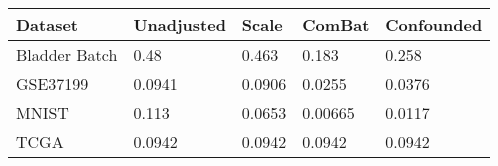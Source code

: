 \centering
\begin{tabular}{l|l|l|l|l}
\hline
Dataset & Unadjusted & Scale & ComBat & Confounded\\
\hline
\rowcolor{gray!6}  Bladder Batch & 0.48 & 0.463 & 0.183 & 0.258\\
\hline
GSE37199 & 0.0941 & 0.0906 & 0.0255 & 0.0376\\
\hline
\rowcolor{gray!6}  MNIST & 0.113 & 0.0653 & 0.00665 & 0.0117\\
\hline
TCGA & 0.0942 & 0.0942 & 0.0942 & 0.0942\\
\hline
\end{tabular}